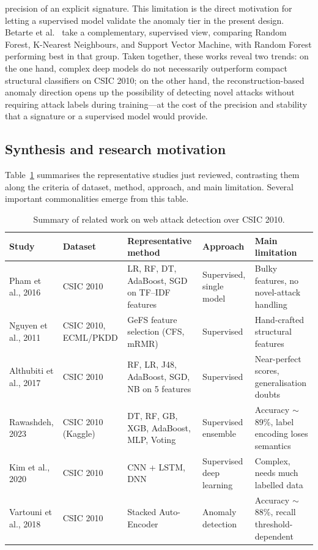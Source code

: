 \documentclass[../main.tex]{subfiles}
\begin{document}
precision of an explicit signature. This limitation is the direct motivation
for letting a supervised model validate the anomaly tier in the present
design. Betarte et al.~\cite{betarte2018} take a complementary, supervised
view, comparing Random Forest, K-Nearest Neighbours, and Support Vector
Machine, with Random Forest performing best in that group. Taken together,
these works reveal two trends: on the one hand, complex deep models do not
necessarily outperform compact structural classifiers on CSIC 2010; on the
other hand, the reconstruction-based anomaly direction opens up the
possibility of detecting novel attacks without requiring attack labels during
training---at the cost of the precision and stability that a signature or a
supervised model would provide.

\subsection{Synthesis and research motivation}

Table~\ref{tab:related} summarises the representative studies just
reviewed, contrasting them along the criteria of dataset, method, approach,
and main limitation. Several important commonalities emerge from this
table.

\begin{table}[H]
  \centering
  \caption{Summary of related work on web attack detection over CSIC 2010.}
  \label{tab:related}
  \renewcommand{\arraystretch}{1.45}
  \setlength{\tabcolsep}{8pt}
  \footnotesize
  \begin{tabular}{|p{2.3cm}|p{1.9cm}|p{3.0cm}|p{1.9cm}|p{2.8cm}|}
    \hline
    \textbf{Study} & \textbf{Dataset} & \textbf{Representative method} &
    \textbf{Approach} & \textbf{Main limitation} \\
    \hline
    Pham et al., 2016 & CSIC 2010 &
    LR, RF, DT, AdaBoost, SGD on TF--IDF features &
    Supervised, single model &
    Bulky features, no novel-attack handling \\
    \hline
    Nguyen et al., 2011 & CSIC 2010, ECML/PKDD &
    GeFS feature selection (CFS, mRMR) & Supervised &
    Hand-crafted structural features \\
    \hline
    Althubiti et al., 2017 & CSIC 2010 &
    RF, LR, J48, AdaBoost, SGD, NB on 5 features &
    Supervised & Near-perfect scores, generalisation doubts \\
    \hline
    Rawashdeh, 2023 & CSIC 2010 (Kaggle) &
    DT, RF, GB, XGB, AdaBoost, MLP, Voting & Supervised ensemble &
    Accuracy $\sim$89\%, label encoding loses semantics \\
    \hline
    Kim et al., 2020 & CSIC 2010 & CNN + LSTM, DNN &
    Supervised deep learning & Complex, needs much labelled data \\
    \hline
    Vartouni et al., 2018 & CSIC 2010 &
    Stacked Auto-Encoder & Anomaly detection &
    Accuracy $\sim$88\%, recall threshold-dependent \\
    \hline
  \end{tabular}
\end{table}
\end{document}
